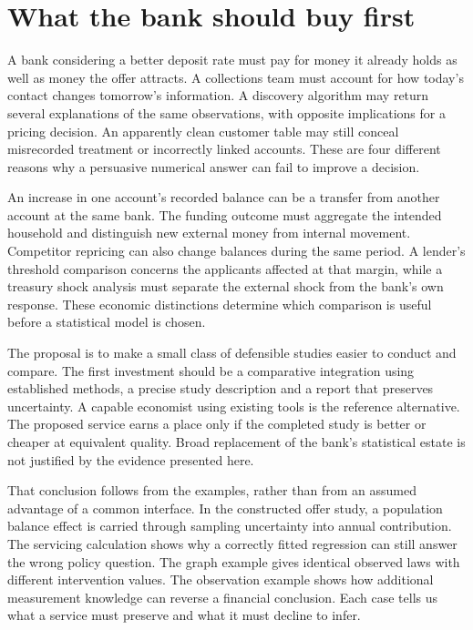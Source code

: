 \chapter*{What the bank should buy first}

A bank considering a better deposit rate must pay for money it already holds
as well as money the offer attracts. A collections team must account for how
today's contact changes tomorrow's information. A discovery algorithm may
return several explanations of the same observations, with opposite implications
for a pricing decision. An apparently clean customer table may still conceal
misrecorded treatment or incorrectly linked accounts. These are four different
reasons why a persuasive numerical answer can fail to improve a decision.

An increase in one account's recorded balance can be a transfer from another
account at the same bank. The funding outcome must aggregate the intended
household and distinguish new external money from internal movement. Competitor
repricing can also change balances during the same period. A lender's threshold
comparison concerns the applicants affected at that margin, while a treasury
shock analysis must separate the external shock from the bank's own response.
These economic distinctions determine which comparison is useful before a
statistical model is chosen.

The proposal is to make a small class of defensible studies easier to conduct
and compare. The first investment should be a comparative integration using
established methods, a precise study description and a report that preserves
uncertainty. A capable economist using existing tools is the reference
alternative. The proposed service earns a place only if the completed study
is better or cheaper at equivalent quality. Broad replacement of the bank's
statistical estate is not justified by the evidence presented here.

That conclusion follows from the examples, rather than from an assumed
advantage of a common interface. In the constructed offer study, a population
balance effect is carried through sampling uncertainty into annual contribution.
The servicing calculation shows why a correctly fitted regression can still
answer the wrong policy question. The graph example gives identical observed
laws with different intervention values. The observation example shows how
additional measurement knowledge can reverse a financial conclusion. Each
case tells us what a service must preserve and what it must decline to infer.

